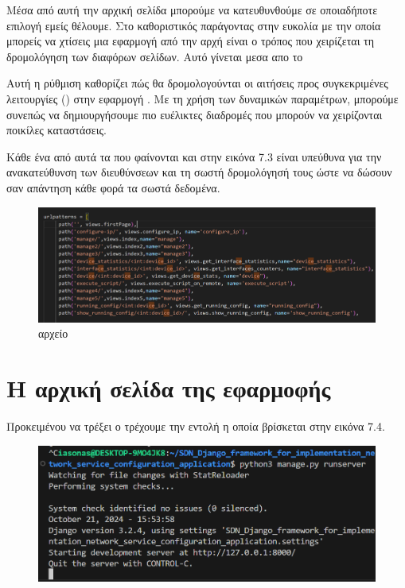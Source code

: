 \FloatBarrier

Μέσα από αυτή την αρχική σελίδα μπορούμε να κατευθυνθούμε σε οποιαδήποτε επιλογή εμείς θέλουμε.
Στο  καθοριστικός παράγοντας στην ευκολία με την οποία
μπορείς να χτίσεις μια εφαρμογή από την αρχή είναι ο τρόπος που χειρίζεται
τη δρομολόγηση των διαφόρων σελίδων. Αυτό γίνεται μεσα απο το 

Αυτή η ρύθμιση καθορίζει πώς θα δρομολογούνται οι 
αιτήσεις  προς συγκεκριμένες λειτουργίες () 
στην εφαρμογή . Με τη χρήση των δυναμικών παραμέτρων, 
μπορούμε συνεπώς να δημιουργήσουμε πιο ευέλικτες διαδρομές  
που μπορούν να χειρίζονται ποικίλες καταστάσεις. 

Κάθε ένα από αυτά τα  που φαίνονται και στην εικόνα 7.3
είναι υπεύθυνα για την ανακατεύθυνση των διευθύνσεων και τη σωστή δρομολόγησή
τους ώστε να δώσουν σαν απάντηση κάθε φορά τα σωστά δεδομένα.

\FloatBarrier
\begin{figure}[h]
	\centering
	\includegraphics[width=1.0\textwidth]{graphics/urls.png}
	\caption{  αρχείο}
\end{figure}

\FloatBarrier



\section{Η αρχική σελίδα της εφαρμοφής}

Προκειμένου να τρέξει ο 
τρέχουμε την εντολή η οποία βρίσκεται στην 
εικόνα 7.4.

\begin{figure}[h]
	\centering
	\includegraphics[width=1.0\textwidth]{graphics/django_server_run.png}
	\caption{ }
\end{figure}






